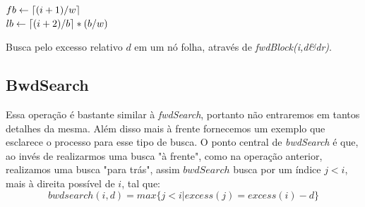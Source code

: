     \begin{algorithm}[h!]
        \vspace{.3cm}
        $fb \leftarrow \lceil(i+1)/w\rceil$\\
        $lb \leftarrow \lceil(i+2)/b\rceil*(b/w)$\\


        
        \caption{Busca pelo excesso relativo $d$ em um nó folha, através de \textit{fwdBlock(i,d\&dr)}.}
        \label{alg:fwdBlock}
    \end{algorithm}

    \subsection{BwdSearch}\label{sc:bwdsearch}
    Essa operação é bastante similar à \textit{fwdSearch}, portanto não entraremos em tantos detalhes da mesma.
    Além disso mais à frente fornecemos um exemplo que esclarece o processo para esse tipo de busca.
    O ponto central de \textit{bwdSearch} é que, ao invés de realizarmos uma busca "à frente", como na operação anterior,
    realizamos uma busca "para trás", assim $bwdSearch$ busca por um índice $j < i$, mais à direita possível de $i$, tal que:
    $$bwdsearch(i,d) = max\{j < i | excess(j) = excess(i) - d\}$$

